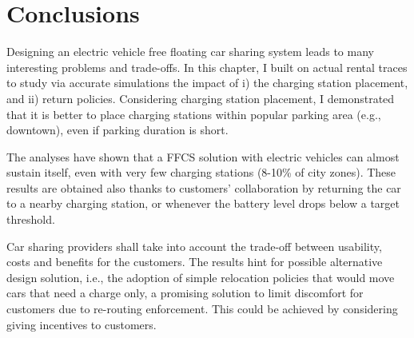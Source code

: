\section{Conclusions}
\label{sec:6_9_conclusion}

Designing an electric vehicle free floating car sharing system leads to many interesting problems and trade-offs.
In this chapter, I built on actual rental traces to study via accurate simulations the impact of i) the charging station placement, and ii) return policies. 
Considering charging station placement, I demonstrated that it is better to place charging stations within popular parking area (e.g., downtown), even if parking duration is short.

The analyses have shown that a FFCS solution with electric vehicles can almost sustain itself, even with very few charging stations (8-10\% of city zones). These results are obtained also thanks to customers' collaboration by returning the car to a nearby charging station, or whenever the battery level drops below a target threshold.

Car sharing providers shall take into account the trade-off between usability, costs and benefits for the customers. 
The results hint for possible alternative design solution, i.e.,  the adoption of simple relocation policies that would move cars that need a charge only, a promising solution to limit discomfort for customers due to re-routing enforcement. This could be achieved by considering giving incentives to customers.

